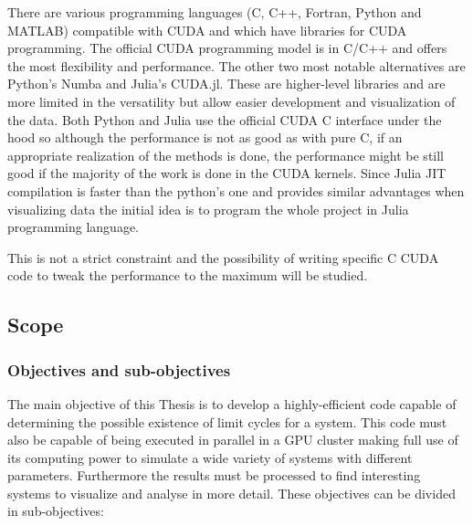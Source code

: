 There are various programming languages (C, C++, Fortran, Python and MATLAB) compatible with CUDA and which have libraries for CUDA programming.
The official CUDA programming model is in C/C++ and offers the most flexibility and performance. The other two most notable alternatives are Python's Numba and Julia's CUDA.jl.
These are higher-level libraries and
are more limited in the versatility
but allow easier development and visualization of the data.
Both Python and Julia use the official CUDA C interface under the hood so
although the performance is not as good as with pure C, if an appropriate
realization of the methods is done, the performance might be still good if the
majority of the work is done in the CUDA kernels. Since Julia JIT compilation is
faster than the python's one and provides similar advantages when visualizing
data the initial idea is to program the whole project in Julia programming
language.

This is not a strict constraint and the possibility of writing specific C CUDA code to tweak the performance to the maximum will be studied.


\subsection{Scope}
\subsubsection{Objectives and sub-objectives}

The main objective of this Thesis is to develop a highly-efficient code capable
of determining the possible existence of limit cycles for a system. This code
must also be capable of being executed in parallel in a GPU cluster making full
use of its computing power to simulate a wide variety of systems with different
parameters. Furthermore the results must be processed to find interesting
systems to visualize and analyse in more detail. These objectives can be divided
in sub-objectives:

